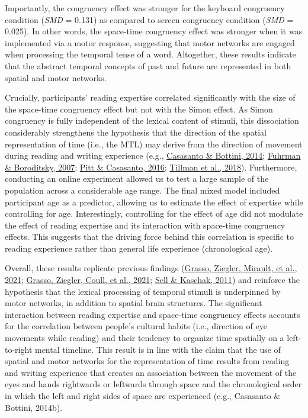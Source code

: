 \documentclass[
  a4paper,12pt,twoside,onecolumn,openright,final,oldfontcommands]{memoir}
\begin{document}
Importantly, the congruency effect was stronger for the keyboard congruency condition (\emph{SMD} = 0.131) as compared to screen congruency condition (\emph{SMD} = 0.025). In other words, the space-time congruency effect was stronger when it was implemented via a motor response, suggesting that motor networks are engaged when processing the temporal tense of a word. Altogether, these results indicate that the abstract temporal concepts of past and future are represented in both spatial and motor networks.

Crucially, participants' reading expertise correlated significantly with the size of the space-time congruency effect but not with the Simon effect. As Simon congruency is fully independent of the lexical content of stimuli, this dissociation considerably strengthens the hypothesis that the direction of the spatial representation of time (i.e., the MTL) may derive from the direction of movement during reading and writing experience (e.g., \protect\hyperlink{ref-casasanto_spatial_2014}{Casasanto \& Bottini, 2014}; \protect\hyperlink{ref-fuhrman_mental_2007}{Fuhrman \& Boroditsky, 2007}; \protect\hyperlink{ref-pitt_reading_2016}{Pitt \& Casasanto, 2016}; \protect\hyperlink{ref-tillman_mental_2018}{Tillman et al., 2018}). Furthermore, conducting an online experiment allowed us to test a large sample of the population across a considerable age range. The final mixed model included participant age as a predictor, allowing us to estimate the effect of expertise while controlling for age. Interestingly, controlling for the effect of age did not modulate the effect of reading expertise and its interaction with space-time congruency effects. This suggests that the driving force behind this correlation is specific to reading experience rather than general life experience (chronological age).

Overall, these results replicate previous findings (\protect\hyperlink{ref-grasso_as_2021}{Grasso, Ziegler, Mirault, et al., 2021}; \protect\hyperlink{ref-grasso_eye_2021}{Grasso, Ziegler, Coull, et al., 2021}; \protect\hyperlink{ref-sell_processing_2011}{Sell \& Kaschak, 2011}) and reinforce the hypothesis that the lexical processing of temporal stimuli is underpinned by motor networks, in addition to spatial brain structures. The significant interaction between reading expertise and space-time congruency effects accounts for the correlation between people's cultural habits (i.e., direction of eye movements while reading) and their tendency to organize time spatially on a left-to-right mental timeline. This result is in line with the claim that the use of spatial and motor networks for the representation of time results from reading and writing experience that creates an association between the movement of the eyes and hands rightwards or leftwards through space and the chronological order in which the left and right sides of space are experienced (e.g., Casasanto \& Bottini, 2014b).
\end{document}
